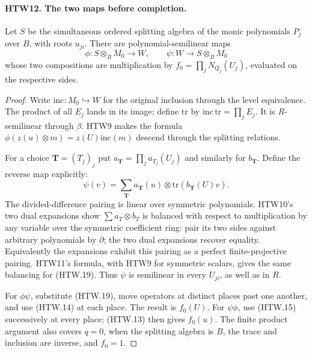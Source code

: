 \paragraph{HTW12. The two maps before completion.}
\label{claim:HTW12}
Let \(S\) be the simultaneous ordered splitting algebra
of the monic polynomials \(P_j\) over \(B\), with roots
\(u_{ji}\).  There are polynomial-semilinear maps
\[
 \phi:S\otimes_BM_0\longrightarrow W,\qquad
 \psi:W\longrightarrow S\otimes_BM_0
\]
whose two compositions are multiplication by
\(f_0=\prod_jN_{Q_j}(U_j)\), evaluated on the respective
sides.
\begin{proof}
Write \(\mathrm{inc}:M_0\hookrightarrow W\) for the
original inclusion through the level equivalence.
The product of all \(E_j\) lands in its image; define
\(\mathrm{tr}\) by
\(\mathrm{inc}\,\mathrm{tr}=\prod_jE_j\).
It is \(R\)-semilinear through \(\beta\).  HTW9 makes
the formula
\(\phi(z(u)\otimes m)=z(U)\mathrm{inc}(m)\)
descend through the splitting relations.

For a choice \(\mathbf T=(T_j)_j\) put
\(a_{\mathbf T}=\prod_ja_{T_j}(U_j)\) and similarly
for \(b_{\mathbf T}\).  Define the reverse map explicitly:
\[
 \psi(v)=\sum_{\mathbf T}a_{\mathbf T}(u)\otimes
                                     \mathrm{tr}(b_{\mathbf T}(U)v).
 \tag{HTW.19}
\]
The divided-difference pairing is linear over symmetric
polynomials.  HTW10's two dual expansions show
\(\sum a_T\otimes b_T\) is balanced with respect to
multiplication by any variable over the symmetric
coefficient ring: pair its two sides against arbitrary
polynomials by \(\partial\); the two dual expansions
recover equality.  Equivalently the expansions exhibit
this pairing as a perfect finite-projective pairing.
HTW11's formula, with HTW9 for symmetric scalars, gives
the same balancing for (HTW.19).  Thus \(\psi\) is
semilinear in every \(U_{ji}\), as well as in \(R\).

For \(\phi\psi\), substitute (HTW.19), move operators
at distinct places past one another, and use
(HTW.14) at each place.  The result is \(f_0(U)\).
For \(\psi\phi\), use (HTW.15) successively at every
place; (HTW.13) then gives \(f_0(u)\).
The finite product argument also covers \(q=0\),
when the splitting algebra is \(B\), the trace and
inclusion are inverse, and \(f_0=1\).
\end{proof}

